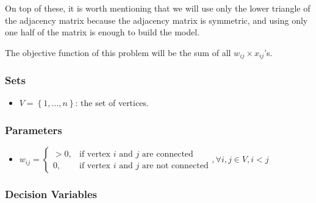 \documentclass[a4paper,12pt]{report}
\begin{document}
On top of these, it is worth mentioning that we will use only the lower triangle of the adjacency matrix because the adjacency matrix is symmetric, and using only one half of the matrix is enough to build the model.

The objective function of this problem will be the sum of all \( w_{ij} \times x_{ij} \)'s.

\subsubsection{Sets}

\begin{itemize}
	\item \( V = \left\{ 1,\dots,n \right\}  \): the set of vertices.
\end{itemize}

\subsubsection{Parameters}
\begin{itemize}
	\item \( w_{ij} = \begin{cases}
			>0, & \text{if vertex $i$ and $j$ are connected} \\
			0, &  \text{if vertex $i$ and $j$ are not connected}
	\end{cases} , \forall i,j \in V, i<j\)
\end{itemize}

\subsubsection{Decision Variables}
\end{document}
